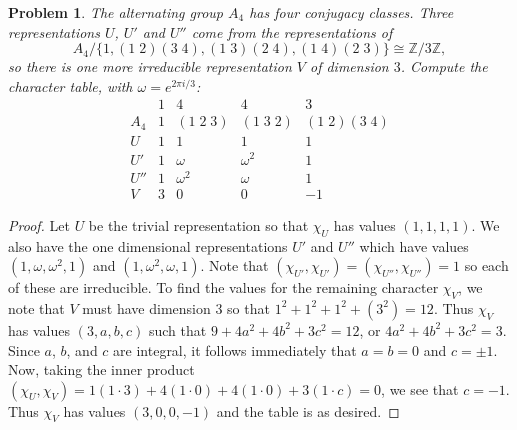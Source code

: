 \documentclass{article}
\newtheorem{problem}{Problem}
\begin{document}
\begin{problem}
\label{a4table}
The alternating group $A_4$ has four conjugacy classes. Three representations $U$, $U'$ and $U''$ come from the representations of
\[
A_4 / \{1, (1 \; 2)(3 \; 4), (1 \; 3)(2 \; 4), (1 \; 4)(2 \; 3)\} \cong \mathbb{Z}/3\mathbb{Z},
\]
so there is one more irreducible representation $V$ of dimension $3$. Compute the character table, with $\omega = e^{2 \pi i/3}$:
\[
\begin{array}{c|cccc}
& 1 & 4 & 4 & 3\\
A_4 & 1 & (1 \; 2 \; 3) & (1 \; 3 \; 2) & (1 \; 2)(3 \; 4)\\
\hline
U & 1 & 1 & 1 & 1\\
U' & 1 & \omega & \omega^2 & 1\\
U'' & 1 & \omega^2 & \omega & 1\\
V & 3 & 0 & 0 & -1
\end{array}
\]
\end{problem}
\begin{proof}
Let $U$ be the trivial representation so that $\chi_U$ has values $(1, 1, 1, 1)$. We also have the one dimensional representations $U'$ and $U''$ which have values $(1, \omega, \omega^2, 1)$ and $(1, \omega^2, \omega, 1)$. Note that $(\chi_{U'}, \chi_{U'}) = (\chi_{U''}, \chi_{U''}) = 1$ so each of these are irreducible. To find the values for the remaining character $\chi_V$, we note that $V$ must have dimension $3$ so that $1^2 + 1^2 + 1^2 + (3^2) = 12$. Thus $\chi_V$ has values $(3, a, b, c)$ such that $9 + 4a^2 + 4b^2 + 3c^2 = 12$, or $4a^2 + 4b^2 + 3c^2 = 3$. Since $a$, $b$, and $c$ are integral, it follows immediately that $a = b = 0$ and $c = \pm 1$. Now, taking the inner product $(\chi_U, \chi_V) = 1(1 \cdot 3) + 4(1 \cdot 0) + 4(1 \cdot 0) + 3(1 \cdot c) = 0$, we see that $c = -1$. Thus $\chi_V$ has values $(3, 0, 0, -1)$ and the table is as desired.
\end{proof}
\end{document}
